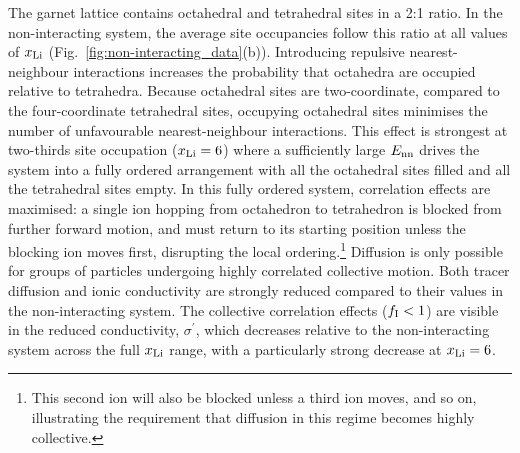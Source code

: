 \documentclass[aps,prb,twocolumn,superscriptaddress,reprint]{revtex4-1}
\newcommand{\xLi}{x_\m{Li}}
\begin{document}
The garnet lattice contains octahedral and tetrahedral sites in a 2:1 ratio. In the non-interacting system, the average site occupancies follow this ratio at all values of $\xLi$ (Fig.~\ref{fig:non-interacting_data}(b)). Introducing repulsive nearest-neighbour interactions increases the probability that octahedra are occupied relative to tetrahedra. Because octahedral sites are two-coordinate, compared to the four-coordinate tetrahedral sites, occupying octahedral sites minimises the number of unfavourable nearest-neighbour interactions. This effect is strongest at two-thirds site occupation ($\xLi=6$) where a sufficiently large $E_{\mathrm{nn}}$ drives the system into a fully ordered arrangement with all the octahedral sites filled and all the tetrahedral sites empty. 
In this fully ordered system, correlation effects are maximised: a single ion hopping from octahedron to tetrahedron is blocked from further forward motion, and must return to its starting position unless the blocking ion moves first, disrupting the local ordering.\footnote{This second ion will also be blocked unless a third ion moves, and so on, illustrating the requirement that diffusion in this regime becomes highly collective.} Diffusion is only possible for groups of particles undergoing highly correlated collective motion.\cite{MorganAndMadden_PhysRevLett2014,BurbanoEtAl_PhysRevLett2016} Both tracer diffusion and ionic conductivity are strongly reduced compared to their values in the non-interacting system. The collective correlation effects ($f_{\mathrm{I}}<1$) are visible in the reduced conductivity, $\sigma^\prime$, which decreases relative to the non-interacting system across the full $\xLi$ range, with a particularly strong decrease at $\xLi=6$.
\end{document}
